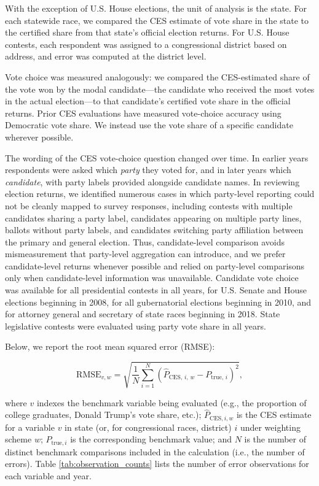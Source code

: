 \documentclass[12pt]{article}
\begin{document}
With the exception of U.S. House elections, the unit of analysis is the state. For each statewide race, we compared the CES estimate of vote share in the state to the certified share from that state's official election returns. For U.S. House contests, each respondent was assigned to a congressional district based on address, and error was computed at the district level.

Vote choice was measured analogously: we compared the CES-estimated share of the vote won by the modal candidate—the candidate who received the most votes in the actual election—to that candidate's certified vote share in the official returns. Prior CES evaluations have measured vote-choice accuracy using Democratic vote share. We instead use the vote share of a specific candidate wherever possible.

The wording of the CES vote-choice question changed over time. In earlier years respondents were asked which \textit{party} they voted for, and in later years which \textit{candidate}, with party labels provided alongside candidate names. In reviewing election returns, we identified numerous cases in which party-level reporting could not be cleanly mapped to survey responses, including contests with multiple candidates sharing a party label, candidates appearing on multiple party lines, ballots without party labels, and candidates switching party affiliation between the primary and general election. Thus, candidate-level comparison avoids mismeasurement that party-level aggregation can introduce, and we prefer candidate-level returns whenever possible and relied on party-level comparisons only when candidate-level information was unavailable. Candidate vote choice was available for all presidential contests in all years, for U.S. Senate and House elections beginning in 2008, for all gubernatorial elections beginning in 2010, and for attorney general and secretary of state races beginning in 2018. State legislative contests were evaluated using party vote share in all years.

Below, we report the root mean squared error (RMSE):

\[
\text{RMSE}_{v,w} = 
\sqrt{\frac{1}{N} \sum_{i=1}^{N} 
\left( \widehat{P}_{\text{CES},\, i,\, w} - P_{\text{true},\, i} \right)^{2}},
\]
 
where \(v\) indexes the benchmark variable being evaluated (e.g., the proportion of college graduates, Donald Trump’s vote share, etc.); 
\(\widehat{P}_{\text{CES},i,w}\) is the CES estimate for a variable \(v\) in state (or, for congressional races, district) \(i\) under weighting scheme \(w\); 
\(P_{\text{true},i}\) is the corresponding benchmark value; 
and \(N\) is the number of distinct benchmark comparisons included in the calculation (i.e., the number of errors). Table \ref{tab:observation_counts} lists the number of error observations for each variable and year.
\end{document}

